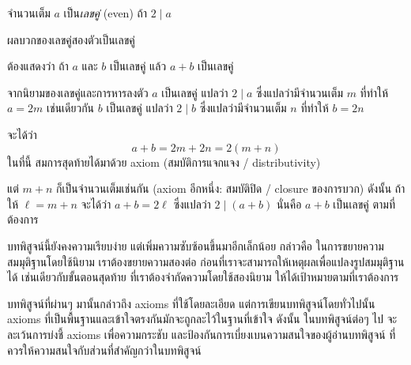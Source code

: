 \begin{definition}
จำนวนเต็ม $a$ เป็น\emph{เลขคู่} (even) ถ้า $2\mid a$
\end{definition}

\begin{theorem}
\label{thm:even-sum-even}
ผลบวกของเลขคู่สองตัวเป็นเลขคู่

\begin{pf}
ต้องแสดงว่า ถ้า $a$ และ $b$ เป็นเลขคู่ แล้ว $a+b$ เป็นเลขคู่

จากนิยามของเลขคู่และการหารลงตัว $a$ เป็นเลขคู่ แปลว่า $2\mid a$ ซึ่งแปลว่ามีจำนวนเต็ม $m$ ที่ทำให้ $a=2m$ เช่นเดียวกัน $b$ เป็นเลขคู่ แปลว่า $2\mid b$ ซึ่งแปลว่ามีจำนวนเต็ม $n$ ที่ทำให้ $b=2n$

จะได้ว่า \[a+b=2m+2n=2(m+n)\] ในที่นี้ สมการสุดท้ายได้มาด้วย axiom (สมบัติการแจกแจง / distributivity)

แต่ $m+n$ ก็เป็นจำนวนเต็มเช่นกัน (axiom อีกหนึ่ง: สมบัติปิด / closure ของการบวก) ดังนั้น ถ้าให้ $\ell=m+n$ จะได้ว่า $a+b=2\ell$ ซึ่งแปลว่า $2\mid (a+b)$ นั่นคือ $a+b$ เป็นเลขคู่ ตามที่ต้องการ
\end{pf}
\end{theorem}
บทพิสูจน์นี้ยังคงความเรียบง่าย แต่เพิ่มความซับซ้อนขึ้นมาอีกเล็กน้อย กล่าวคือ ในการขยายความสมมุติฐานโดยใช้นิยาม เราต้องขยายความสองต่อ ก่อนที่เราจะสามารถให้เหตุผลเพื่อแปลงรูปสมมุติฐานได้ เช่นเดียวกับขั้นตอนสุดท้าย ที่เราต้องจำกัดความโดยใช้สองนิยาม ให้ได้เป้าหมายตามที่เราต้องการ

บทพิสูจน์ที่ผ่านๆ มานั้นกล่าวถึง axioms ที่ใช้โดยละเอียด แต่การเขียนบทพิสูจน์โดยทั่วไปนั้น axioms ที่เป็นพื้นฐานและเข้าใจตรงกันมักจะถูกละไว้ในฐานที่เข้าใจ ดังนั้น ในบทพิสูจน์ต่อๆ ไป จะละเว้นการบ่งชี้ axioms เพื่อความกระชับ และป้องกันการเบี่ยงเบนความสนใจของผู้อ่านบทพิสูจน์ ที่ควรให้ความสนใจกับส่วนที่สำคัญกว่าในบทพิสูจน์

